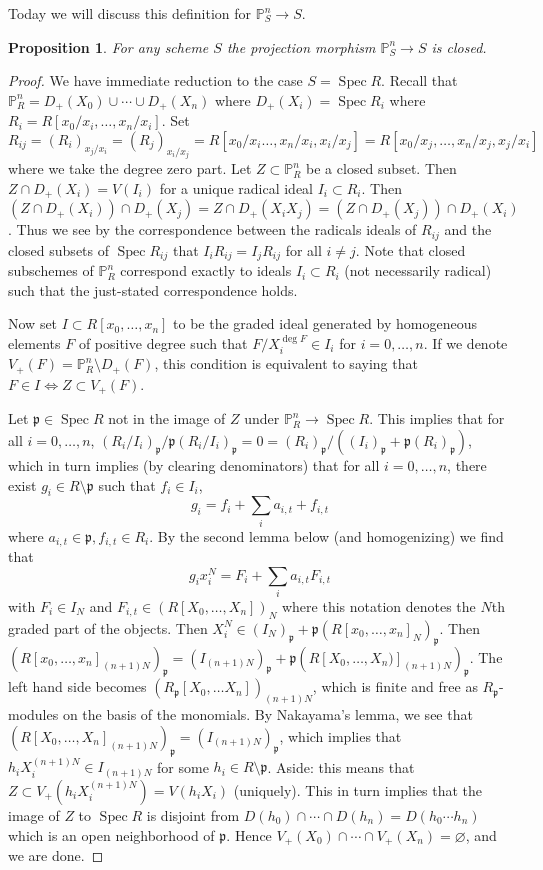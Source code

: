 \documentclass{article}
\newcommand{\Proj}{\mathbb{P}}
\newcommand{\fr}{\mathfrak}
\DeclareMathOperator{\Spec}{Spec}
\theoremstyle{plain}
\newtheorem*{prop*}{Proposition}
\theoremstyle{definition}
\theoremstyle{remark}
\begin{document}
Today we will discuss this definition for $\Proj_S^n\to S$.

\begin{prop*}
For any scheme $S$ the projection morphism $\Proj_S^n\to S$ is closed.
\end{prop*}
\begin{proof}
We have immediate reduction to the case $S=\Spec R$.
Recall that $\Proj_R^n=D_+(X_0)\cup\cdots\cup D_+(X_n)$ where $D_+(X_i)=\Spec R_i$ where $R_i=R[x_0/x_i,\ldots, x_n/x_i]$.
Set $R_{ij}=(R_i)_{x_j/x_i}=(R_j)_{x_i/x_j}=R[x_0/x_i\ldots, x_n/x_i,x_i/x_j]=R[x_0/x_j,\ldots, x_n/x_j,x_j/x_i]$ where we take the degree zero part.
Let $Z\subset \Proj_R^n$ be a closed subset. Then $Z\cap D_+(X_i)=V(I_i)$ for a unique radical ideal $I_i\subset R_i$.
Then $(Z\cap D_+(X_i))\cap D_+(X_j)=Z\cap D_+(X_iX_j)=(Z\cap D_+(X_j))\cap D_+(X_i)$.
Thus we see by the correspondence between the radicals ideals of $R_{ij}$ and the closed subsets of $\Spec R_{ij}$ that $I_iR_{ij}=I_jR_{ij}$ for all $i\neq j$.
Note that closed subschemes of $\Proj_R^n$ correspond exactly to ideals $I_i\subset R_i$ (not necessarily radical) such that the just-stated correspondence holds.

Now set $I\subset R[x_0,\ldots, x_n]$ to be the graded ideal generated by homogeneous elements $F$ of positive degree such that $F/X_i^{\deg F}\in I_i$ for $i=0,\ldots, n$. If we denote  $V_+(F)=\Proj_R^n\setminus D_+(F)$, this condition is equivalent to saying that $F\in I\iff Z\subset V_+(F)$.

Let $\fr p\in\Spec R$ not in the image of $Z$ under $\Proj_R^n\to\Spec R$. This implies that for all $i=0,\ldots,n$, $(R_i/I_i)_{\fr p}/\fr p(R_i/I_i)_{\fr p}=0=(R_i)_{\fr p}/((I_i)_\fr p+\fr p(R_i)_{\fr p})$, which in turn implies (by clearing denominators) that for all $i=0,\ldots, n$, there exist $g_i\in R\setminus\fr p$ such that $f_i\in I_i$,
\[g_i=f_i+\sum_i a_{i,t}+f_{i,t}\]
where $a_{i,t}\in\fr p,f_{i,t}\in R_i$. By the second lemma below (and homogenizing) we find that
\[g_ix_i^N=F_i+\sum_i a_{i,t}F_{i,t}\]
with $F_i\in I_N$ and $F_{i,t}\in (R[X_0,\ldots, X_n])_N$ where this notation denotes the $N$th graded part of the objects. Then $X_i^N\in (I_N)_{\fr p}+\fr p(R[x_0,\ldots,x_n]_N)_{\fr p}$. Then $(R[x_0,\ldots,x_n]_{(n+1)N})_{\fr p}=(I_{(n+1)N})_{\fr p}+\fr p(R[X_0,\ldots, X_n)]_{(n+1)N})_{\fr p}$. The left hand side becomes $(R_{\fr p}[X_0,\ldots X_n])_{(n+1)N}$, which is finite and free as $R_{\fr p}$-modules on the basis of the monomials. By Nakayama's lemma, we see that $(R[X_0,\ldots,X_n]_{(n+1)N})_{\fr p}=(I_{(n+1)N})_{\fr p}$, which implies that $h_iX_i^{(n+1)N}\in I_{(n+1)N}$ for some $h_i\in R\setminus\fr p$.
Aside: this means that $Z\subset V_+(h_iX_i^{(n+1)N})=V(h_iX_i)$ (uniquely).
This in turn implies that the image of $Z$ to $\Spec R$ is disjoint from $D(h_0)\cap\cdots\cap D(h_n)=D(h_0\cdots h_n)$ which is an open neighborhood of $\fr p$. Hence $V_+(X_0)\cap\cdots\cap V_+(X_n)=\varnothing$, and we are done.
\end{proof}
\end{document}
